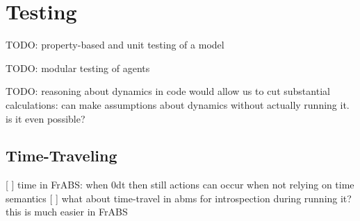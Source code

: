 \section{Testing}

TODO: property-based and unit testing of a model

TODO: modular testing of agents

TODO: reasoning about dynamics in code would allow us to cut substantial calculations: can make assumptions about dynamics without actually running it. is it even possible?

\cite{perez_testing_2017}

\subsection{Time-Traveling}

\cite{perez_back_2017}

[ ] time in FrABS: when 0dt then still actions can occur when not relying on time semantics
[ ] what about time-travel in abms for introspection during running it? this is much easier in FrABS